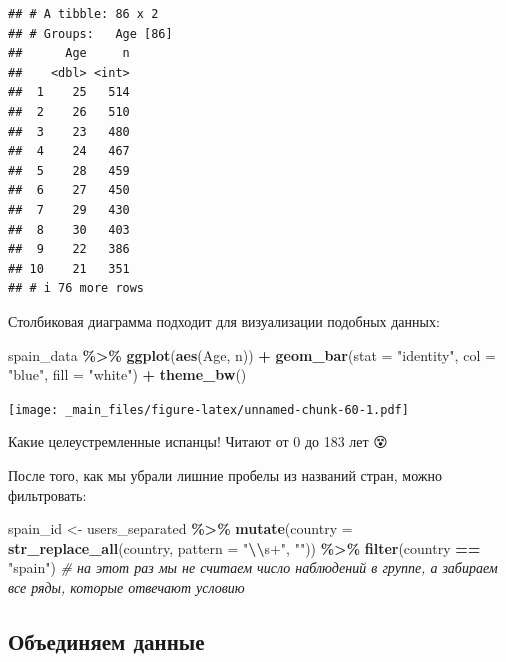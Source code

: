 \documentclass[
]{book}
\newenvironment{Shaded}{\begin{snugshade}}{\end{snugshade}}
\newcommand{\AttributeTok}[1]{\textcolor[rgb]{0.13,0.29,0.53}{#1}}
\newcommand{\CommentTok}[1]{\textcolor[rgb]{0.56,0.35,0.01}{\textit{#1}}}
\newcommand{\FunctionTok}[1]{\textcolor[rgb]{0.13,0.29,0.53}{\textbf{#1}}}
\newcommand{\NormalTok}[1]{#1}
\newcommand{\OtherTok}[1]{\textcolor[rgb]{0.56,0.35,0.01}{#1}}
\newcommand{\SpecialCharTok}[1]{\textcolor[rgb]{0.81,0.36,0.00}{\textbf{#1}}}
\newcommand{\StringTok}[1]{\textcolor[rgb]{0.31,0.60,0.02}{#1}}
\theoremstyle{definition}
\theoremstyle{definition}
\theoremstyle{definition}
\theoremstyle{definition}
\theoremstyle{remark}
\begin{document}
\begin{verbatim}
## # A tibble: 86 x 2
## # Groups:   Age [86]
##      Age     n
##    <dbl> <int>
##  1    25   514
##  2    26   510
##  3    23   480
##  4    24   467
##  5    28   459
##  6    27   450
##  7    29   430
##  8    30   403
##  9    22   386
## 10    21   351
## # i 76 more rows
\end{verbatim}

Столбиковая диаграмма подходит для визуализации подобных данных:

\begin{Shaded}
\begin{Highlighting}[]
\NormalTok{spain\_data }\SpecialCharTok{\%\textgreater{}\%} 
  \FunctionTok{ggplot}\NormalTok{(}\FunctionTok{aes}\NormalTok{(Age, n)) }\SpecialCharTok{+} 
  \FunctionTok{geom\_bar}\NormalTok{(}\AttributeTok{stat =} \StringTok{"identity"}\NormalTok{, }\AttributeTok{col =} \StringTok{"blue"}\NormalTok{, }\AttributeTok{fill =} \StringTok{"white"}\NormalTok{) }\SpecialCharTok{+}
  \FunctionTok{theme\_bw}\NormalTok{()}
\end{Highlighting}
\end{Shaded}

\texttt{[image: \_main\_files/figure-latex/unnamed-chunk-60-1.pdf]}

Какие целеустремленные испанцы! Читают от 0 до 183 лет 😵

После того, как мы убрали лишние пробелы из названий стран, можно фильтровать:

\begin{Shaded}
\begin{Highlighting}[]
\NormalTok{spain\_id }\OtherTok{\textless{}{-}}\NormalTok{ users\_separated }\SpecialCharTok{\%\textgreater{}\%}
  \FunctionTok{mutate}\NormalTok{(}\AttributeTok{country =} \FunctionTok{str\_replace\_all}\NormalTok{(country, }\AttributeTok{pattern =} \StringTok{"}\SpecialCharTok{\textbackslash{}\textbackslash{}}\StringTok{s+"}\NormalTok{, }\StringTok{""}\NormalTok{)) }\SpecialCharTok{\%\textgreater{}\%}
  \FunctionTok{filter}\NormalTok{(country }\SpecialCharTok{==} \StringTok{"spain"}\NormalTok{) }\CommentTok{\# на этот раз мы не считаем число наблюдений в группе, а забираем все ряды, которые отвечают условию}
\end{Highlighting}
\end{Shaded}

\hypertarget{ux43eux431ux44aux435ux434ux438ux43dux44fux435ux43c-ux434ux430ux43dux43dux44bux435}{%
\subsection{Объединяем данные}\label{ux43eux431ux44aux435ux434ux438ux43dux44fux435ux43c-ux434ux430ux43dux43dux44bux435}}
\end{document}
